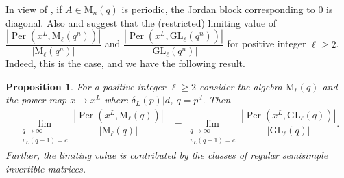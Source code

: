 \documentclass[11pt,twoside]{amsart}
\newcommand{\GL}{\mathrm{GL}}
\newcommand{\M}{\mathrm{M}}
\newcommand{\per}{\operatorname{Per}}
\newtheorem{proposition}[lemma]{Proposition}
\theoremstyle{definition} %
\begin{document}
In view of , if $A\in \M_n(q)$ is periodic, the Jordan block corresponding to $0$ is diagonal. 
Also  and  suggest that the (restricted) limiting value of $\dfrac{\left|\per(x^L,\M_\ell(q^n))\right|}{|\M_\ell(q^n)|}$ and $\dfrac{\left|\per(x^L,\GL_\ell(q^n))\right|}{|\GL_\ell(q^n)|}$ for positive integer $\ell\geq 2$. 
Indeed, this is the case, and we have the following result.
\begin{proposition}\label{prop:lim-reduction}
    For a positive integer $\ell\geq2$ consider the algebra $\M_\ell(q)$ and the power map $x\mapsto x^L$ where $\delta_L(p)|d$, $q=p^d$. 
    Then
    \begin{align*}
              \lim\limits_{\substack{q\longrightarrow \infty\\v_L(q-1)=c}}\dfrac{\left|\per(x^L,\M_\ell(q))\right|}{|\M_\ell(q)|}
    &=    \lim\limits_{\substack{q\longrightarrow \infty\\
    v_L(q-1)=c}}\dfrac{\left|\per(x^L,\GL_\ell(q))\right|}{|\GL_\ell(q)|}.
    \end{align*}
    Further, the limiting value is contributed by the classes of regular semisimple invertible matrices.
\end{proposition}
\end{document}
